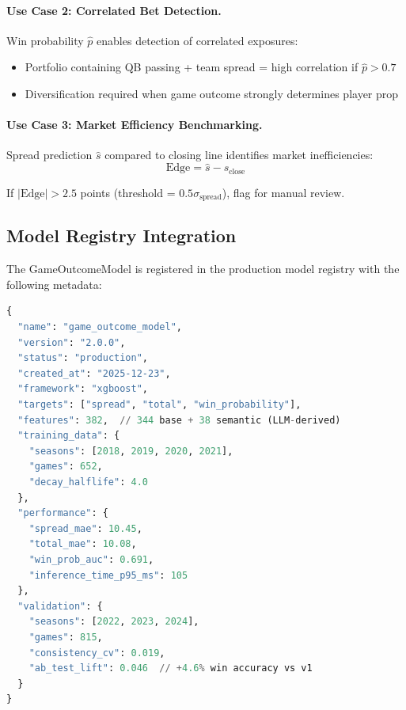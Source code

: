 \paragraph{Use Case 2: Correlated Bet Detection.}
Win probability $\hat{p}$ enables detection of correlated exposures:
\begin{itemize}[itemsep=2pt,parsep=0pt]
    \item Portfolio containing QB passing + team spread = high correlation if $\hat{p} > 0.7$
    \item Diversification required when game outcome strongly determines player prop
\end{itemize}

\paragraph{Use Case 3: Market Efficiency Benchmarking.}
Spread prediction $\hat{s}$ compared to closing line identifies market inefficiencies:
\begin{equation}
\text{Edge} = \hat{s} - s_{\text{close}}
\end{equation}

If $|\text{Edge}| > 2.5$ points (threshold = $0.5 \sigma_{\text{spread}}$), flag for manual review.

\subsection{Model Registry Integration}

The GameOutcomeModel is registered in the production model registry with the following metadata:

\begin{lstlisting}[language=Python,style=codestyle,caption={Model Registry Entry (v2.0)},label={lst:game-outcome-registry}]
{
  "name": "game_outcome_model",
  "version": "2.0.0",
  "status": "production",
  "created_at": "2025-12-23",
  "framework": "xgboost",
  "targets": ["spread", "total", "win_probability"],
  "features": 382,  // 344 base + 38 semantic (LLM-derived)
  "training_data": {
    "seasons": [2018, 2019, 2020, 2021],
    "games": 652,
    "decay_halflife": 4.0
  },
  "performance": {
    "spread_mae": 10.45,
    "total_mae": 10.08,
    "win_prob_auc": 0.691,
    "inference_time_p95_ms": 105
  },
  "validation": {
    "seasons": [2022, 2023, 2024],
    "games": 815,
    "consistency_cv": 0.019,
    "ab_test_lift": 0.046  // +4.6% win accuracy vs v1
  }
}
\end{lstlisting}

